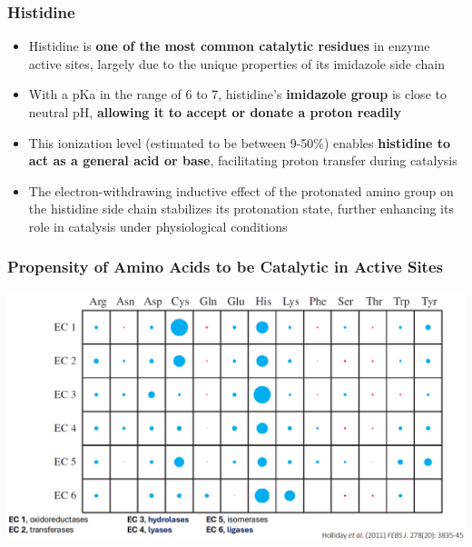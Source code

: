 \documentclass[10pt]{article}
\begin{document}
\subsubsection*{Histidine}
\begin{itemize}
    \item Histidine is \textbf{one of the most common catalytic residues} in enzyme active sites, largely due to the unique properties of its imidazole side chain
    \item With a pKa in the range of 6 to 7, histidine's \textbf{imidazole group} is close to neutral pH, \textbf{allowing it to accept or donate a proton readily}
    \item This ionization level (estimated to be between 9-50\%) enables \textbf{histidine to act as a general acid or base}, facilitating proton transfer during catalysis
    \item The electron-withdrawing inductive effect of the protonated amino group on the histidine side chain stabilizes its protonation state, further enhancing its role in catalysis under physiological conditions
\end{itemize}

\subsubsection*{Propensity of Amino Acids to be Catalytic in Active Sites}
\begin{center}
    \includegraphics*[width=\textwidth]{L2_14.png} 
\end{center}
\end{document}
